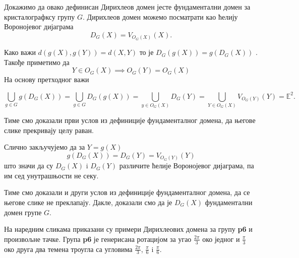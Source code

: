 \documentclass[12pt]{article}
\begin{document}
\noindent  Докажимо да овако дефинисан Дирихлеов домен јесте фундаментални домен за кристалографксу групу $G$.
Дирихлеов домен можемо посматрати као ћелију Воронојевог дијаграма 
$$D_G(X)= V_{O_G(X)}(X).$$

\noindent Како важи $d(g(X), g(Y))= d(X,Y)$ то је  $D_G(g(X)) = g(D_G(X))$  .
Такође приметимо да $$Y \in  O_G(X) \implies O_G(Y) = O_G(X) $$
На основу претходног важи

$$\bigcup_{g\in G}g(D_G(X)) = \bigcup_{g\in G}D_G(g(X)) = \bigcup_{y \in O_G(X)}D_G(Y)
= \bigcup_{Y \in O_G(X)}V_{O_G(Y)}(Y) = \mathbb{E}^2.$$

\noindent Тиме смо доказали први услов из дефиниције фундаменталног домена, да његове слике прекривају целу раван.

\noindent Слично закључујемо да за $Y = g(X)$
$$g(D_G(X)) = D_G(Y) = V_{O_G(Y)}(Y)$$ што значи да су $D_G(X)$ i $D_G(Y)$ различите ћелије Воронојевог дијаграма, па им сед унутрашњости не секу. 

Тиме смо доказали и други услов из дефиниције фундаменталног домена, да се његове слике не преклапају. Дакле, доказали смо да је $D_G(X)$ фундаментални домен групе $G$.

На наредним сликама приказани су примери Дирихлеових домена за групу \textbf{p6} и произвољне тачке. 
Група \textbf{p6} је генерисана ротацијом за угао \(\frac{2\pi}{3}\) око једног
и \(\frac{\pi}{3}\) око друга два темена троугла са угловима \(\frac{2\pi}{3}\), \(\frac{\pi}{6}\) i \(\frac{\pi}{6}\).
\end{document}
